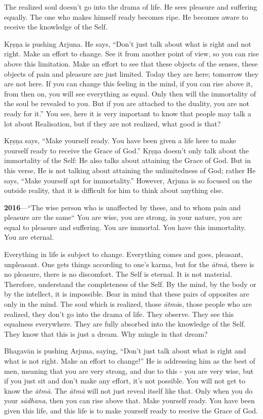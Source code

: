 The realized soul doesn’t go into the drama of life. He sees pleasure and suffering equally. The one who makes himself ready becomes ripe. He becomes aware to receive the knowledge of the Self.

Kṛṣṇa is pushing Arjuna. He says, “Don’t just talk about what is right and not right. Make an effort to change. See it from another point of view, so you can rise above this limitation. Make an effort to see that these objects of the senses, these objects of pain and pleasure are just limited. Today they are here; tomorrow they are not here. If you can change this feeling in the mind, if you can rise above it, from then on, you will see everything as equal. Only then will the immortality of the soul be revealed to you. But if you are attached to the duality, you are not ready for it.” You see, here it is very important to know that people may talk a lot about Realisation, but if they are not realized, what good is that?

Kṛṣṇa says, “Make yourself ready. You have been given a life here to make yourself ready to receive the Grace of God.” Kṛṣṇa doesn’t only talk about the immortality of the Self: He also talks about attaining the Grace of God. But in this verse, He is not talking about attaining the unlimitedness of God; rather He says, “Make yourself apt for immortality.” However, Arjuna is so focused on the outside reality, that it is difficult for him to think about anything else.

\textbf{2016}---“The wise person who is unaffected by these, and to whom pain and pleasure are the same“ You are wise, you are strong, in your nature, you are equal to pleasure and suffering. You are immortal. You have this immortality. You are eternal.

Everything in life is subject to change. Everything comes and goes, pleasant, unpleasant. One gets things according to one’s karma, but for the \textit{ātmā}, there is no pleasure, there is no discomfort. The Self is eternal. It is not material. Therefore, understand the completeness of the Self. By the mind, by the body or by the intellect, it is impossible. Bear in mind that these pairs of opposites are only in the mind. The soul which is realized, those \textit{ātmā}s, those people who are realized, they don’t go into the drama of life. They observe. They see this equalness everywhere. They are fully absorbed into the knowledge of the Self. They know that this is just a dream. Why mingle in that dream?

Bhagavān is pushing Arjuna, saying, “Don’t just talk about what is right and what is not right. Make an effort to change!” He is addressing him as the best of men, meaning that you are very strong, and due to this - you are very wise, but if you just sit and don’t make any effort, it’s not possible. You will not get to know the \textit{ātmā}. The \textit{ātmā} will not just reveal itself like that. Only when you do your \textit{sādhana}, then you can rise above that. Make yourself ready. You have been given this life, and this life is to make yourself ready to receive the Grace of God.

